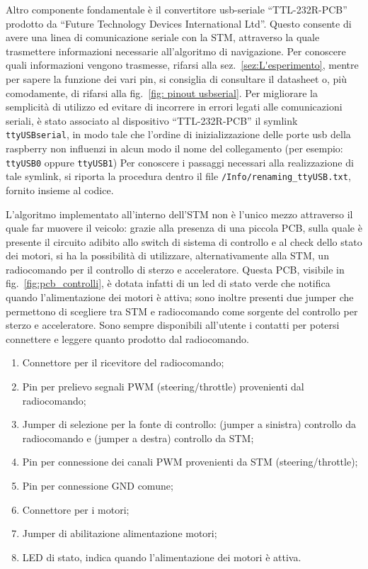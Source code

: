 Altro componente fondamentale \`e il convertitore usb-seriale ``TTL-232R-PCB'' prodotto da 
``Future Technology Devices International Ltd''. 
Questo consente di avere una linea di comunicazione seriale con la STM, attraverso la quale trasmettere informazioni necessarie all'algoritmo di navigazione.
Per conoscere quali informazioni vengono trasmesse, rifarsi alla sez.~\ref{sez:L'esperimento}, mentre per sapere la funzione dei vari pin, si consiglia di consultare il datasheet o, pi\`u comodamente, di rifarsi alla fig.~\ref{fig: pinout usbserial}. 
Per migliorare la semplicità di utilizzo ed evitare di incorrere in errori legati alle comunicazioni seriali, \`e stato associato al dispositivo ``TTL-232R-PCB'' il symlink \texttt{ttyUSBserial}, in modo tale che l’ordine di inizializzazione delle porte usb della raspberry non influenzi in alcun modo il nome del collegamento (per esempio: \texttt{ttyUSB0} oppure  \texttt{ttyUSB1})
Per conoscere i passaggi necessari alla realizzazione di tale symlink, si riporta la procedura dentro il file \texttt{/Info/renaming\_ttyUSB.txt}, fornito insieme al codice.


L'algoritmo implementato all'interno dell'STM non è l'unico mezzo attraverso il quale far muovere il veicolo: grazie alla presenza di una piccola PCB, sulla quale è presente il circuito adibito allo switch di sistema di controllo e al check dello stato dei motori, si ha la possibilità di utilizzare, alternativamente alla STM, un radiocomando per il controllo di sterzo e acceleratore.
Questa PCB, visibile in fig.~\ref{fig:pcb_controlli}, è dotata infatti di un led di stato verde che notifica quando l’alimentazione dei motori è attiva; sono inoltre presenti due jumper che permettono di scegliere tra STM e radiocomando come sorgente del controllo per sterzo e acceleratore. 
Sono sempre disponibili all’utente i contatti per potersi connettere e leggere quanto prodotto dal radiocomando.

\begin{enumerate}
    \item Connettore per il ricevitore del radiocomando;
    \item Pin per prelievo segnali PWM (steering/throttle) provenienti dal radiocomando;
    \item Jumper di selezione per la fonte di controllo: (jumper a sinistra) controllo da radiocomando e (jumper a destra) controllo da STM;
	\item Pin per connessione dei canali PWM provenienti da STM (steering/throttle);
    \item Pin per connessione GND comune;
    \item Connettore per i motori;
    \item Jumper di abilitazione alimentazione motori;
    \item LED di stato, indica quando l'alimentazione dei motori è attiva.
\end{enumerate}

